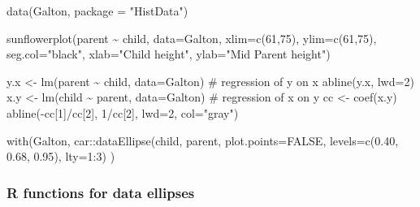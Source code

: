 \documentclass[
  letterpaper,
  10pt,
  krantz2]{krantz}
\makeatletter
\newenvironment{Shaded}{\begin{snugshade}}{\end{snugshade}}
\newcommand{\AttributeTok}[1]{\textcolor[rgb]{0.40,0.45,0.13}{#1}}
\newcommand{\CommentTok}[1]{\textcolor[rgb]{0.37,0.37,0.37}{#1}}
\newcommand{\ConstantTok}[1]{\textcolor[rgb]{0.56,0.35,0.01}{#1}}
\newcommand{\DecValTok}[1]{\textcolor[rgb]{0.68,0.00,0.00}{#1}}
\newcommand{\FloatTok}[1]{\textcolor[rgb]{0.68,0.00,0.00}{#1}}
\newcommand{\FunctionTok}[1]{\textcolor[rgb]{0.28,0.35,0.67}{#1}}
\newcommand{\NormalTok}[1]{\textcolor[rgb]{0.00,0.23,0.31}{#1}}
\newcommand{\OtherTok}[1]{\textcolor[rgb]{0.00,0.23,0.31}{#1}}
\newcommand{\SpecialCharTok}[1]{\textcolor[rgb]{0.37,0.37,0.37}{#1}}
\newcommand{\StringTok}[1]{\textcolor[rgb]{0.13,0.47,0.30}{#1}}
\newenvironment{kframe}{%
  \medskip{}
  \setlength{\fboxsep}{.8em}
  \def\at@end@of@kframe{}%
  \ifinner\ifhmode%
  \def\at@end@of@kframe{\end{minipage}}%
  \begin{minipage}{\columnwidth}%
  \fi\fi%
  \def\FrameCommand##1{\hskip\@totalleftmargin \hskip-\fboxsep
  \colorbox{shadecolor}{##1}\hskip-\fboxsep
      \hskip-\linewidth \hskip-\@totalleftmargin \hskip\columnwidth}%
  \MakeFramed {\advance\hsize-\width
    \@totalleftmargin\z@ \linewidth\hsize
    \@setminipage}}%
{\par\unskip\endMakeFramed%
  \at@end@of@kframe}
\renewenvironment{Shaded}{\begin{kframe}}{\end{kframe}}
\makeatother
\begin{document}
\begin{Shaded}
\begin{Highlighting}[]
\FunctionTok{data}\NormalTok{(Galton, }\AttributeTok{package =} \StringTok{"HistData"}\NormalTok{)}

\FunctionTok{sunflowerplot}\NormalTok{(parent }\SpecialCharTok{\textasciitilde{}}\NormalTok{ child, }\AttributeTok{data=}\NormalTok{Galton, }
      \AttributeTok{xlim=}\FunctionTok{c}\NormalTok{(}\DecValTok{61}\NormalTok{,}\DecValTok{75}\NormalTok{), }
      \AttributeTok{ylim=}\FunctionTok{c}\NormalTok{(}\DecValTok{61}\NormalTok{,}\DecValTok{75}\NormalTok{), }
      \AttributeTok{seg.col=}\StringTok{"black"}\NormalTok{, }
        \AttributeTok{xlab=}\StringTok{"Child height"}\NormalTok{, }
      \AttributeTok{ylab=}\StringTok{"Mid Parent height"}\NormalTok{)}

\NormalTok{y.x }\OtherTok{\textless{}{-}} \FunctionTok{lm}\NormalTok{(parent }\SpecialCharTok{\textasciitilde{}}\NormalTok{ child, }\AttributeTok{data=}\NormalTok{Galton)     }\CommentTok{\# regression of y on x}
\FunctionTok{abline}\NormalTok{(y.x, }\AttributeTok{lwd=}\DecValTok{2}\NormalTok{)}
\NormalTok{x.y }\OtherTok{\textless{}{-}} \FunctionTok{lm}\NormalTok{(child }\SpecialCharTok{\textasciitilde{}}\NormalTok{ parent, }\AttributeTok{data=}\NormalTok{Galton)     }\CommentTok{\# regression of x on y}
\NormalTok{cc }\OtherTok{\textless{}{-}} \FunctionTok{coef}\NormalTok{(x.y)}
\FunctionTok{abline}\NormalTok{(}\SpecialCharTok{{-}}\NormalTok{cc[}\DecValTok{1}\NormalTok{]}\SpecialCharTok{/}\NormalTok{cc[}\DecValTok{2}\NormalTok{], }\DecValTok{1}\SpecialCharTok{/}\NormalTok{cc[}\DecValTok{2}\NormalTok{], }\AttributeTok{lwd=}\DecValTok{2}\NormalTok{, }\AttributeTok{col=}\StringTok{"gray"}\NormalTok{)}

\FunctionTok{with}\NormalTok{(Galton, }
\NormalTok{     car}\SpecialCharTok{::}\FunctionTok{dataEllipse}\NormalTok{(child, parent, }
         \AttributeTok{plot.points=}\ConstantTok{FALSE}\NormalTok{, }
         \AttributeTok{levels=}\FunctionTok{c}\NormalTok{(}\FloatTok{0.40}\NormalTok{, }\FloatTok{0.68}\NormalTok{, }\FloatTok{0.95}\NormalTok{), }
         \AttributeTok{lty=}\DecValTok{1}\SpecialCharTok{:}\DecValTok{3}\NormalTok{)}
\NormalTok{    )}
\end{Highlighting}
\end{Shaded}

\hypertarget{r-functions-for-data-ellipses}{%
\subsubsection{R functions for data
ellipses}\label{r-functions-for-data-ellipses}}
\end{document}
